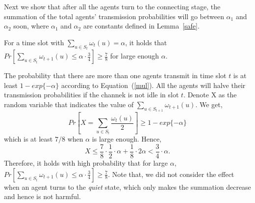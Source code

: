 Next we show that after all the agents turn to the connecting stage, 
the summation of the total agents' transmission probabilities will go
between $\alpha_1$ and $\alpha_2$ soon, where $\alpha_1$ and $\alpha_2$
are constants defined in Lemma~\ref{safe}.
\begin{lemma}
    \label{lemma7}
    For a time slot with ${\sum}_{u\in S_t}\omega_t(u)=\alpha$, it holds that
    $Pr[{\sum}_{u\in S_t}\omega_{t+1}(u) \leq \alpha\cdot\frac{3}{4}] 
    \geq \frac{7}{8}$
    for large enough $\alpha$.
\end{lemma}
\begin{IEEEproof}
    The probability that there are more than one agents transmit in time slot 
    $t$ is at least $1-exp\{-\alpha\}$ according to Equation~(\ref{mul}).
    All the agents will halve their transmission probabilities if the channek is 
    not idle in slot $t$. Denote X as the random variable that indicates the value of 
    ${\sum}_{u\in S_{t+1}}\omega_{t+1}(u)$. We get,
    \begin{equation*}
        Pr[X ={\sum}_{u\in S_t}\frac{\omega_t(u)}{2}] 
        \geq 1 - exp\{-\alpha\}
    \end{equation*}
    which is at least $7/8$ when $\alpha$ is large enough. Hence,
    \begin{equation*}
        X \leq \frac{7}{8}\cdot\frac{1}{2}\cdot\alpha + 
        \frac{1}{8}\cdot 2\alpha 
        < \frac{3}{4}\cdot\alpha.
    \end{equation*}
    Therefore, it holds with high probability that for large $\alpha$, $Pr[{\sum}_{u\in S_t}\omega_{t+1}(u) 
    \leq \alpha\cdot\frac{3}{4}] \geq \frac{7}{8}$.
    Note that, 
    we did not consider the effect when an agent turns to the \emph{quiet} state,
    which only makes the summation decrease and hence is not harmful. 
\end{IEEEproof}

